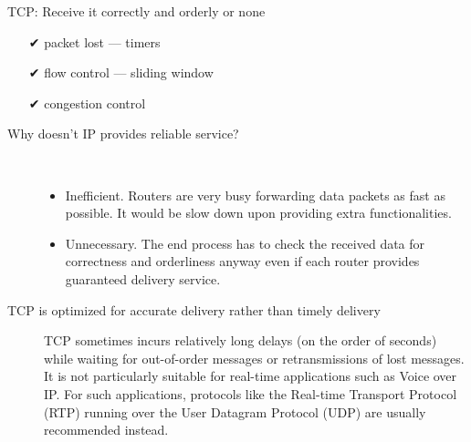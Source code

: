 \begin{frame}
\begin{minipage}[t]{.5\linewidth}
\begin{iblock}{TCP: Receive it correctly and orderly or none}
\begin{itemize}
      \item[✔] packet lost --- timers
      \item[✔] flow control --- sliding window
      \item[✔] congestion control
      \end{itemize}
    \end{iblock}
  \end{minipage}
\end{frame}

\begin{description}
\item[Why doesn't IP provides reliable service?]\,
  \begin{itemize}
  \item Inefficient. Routers are very busy forwarding data packets as fast as possible. It
    would be slow down upon providing extra functionalities.
  \item Unnecessary. The end process has to check the received data for correctness and
    orderliness anyway even if each router provides guaranteed delivery service.
  \end{itemize}
\item[TCP is optimized for accurate delivery rather than timely delivery] TCP sometimes
  incurs relatively long delays (on the order of seconds) while waiting for out-of-order
  messages or retransmissions of lost messages. It is not particularly suitable for
  real-time applications such as Voice over IP. For such applications, protocols like the
  Real-time Transport Protocol (RTP) running over the User Datagram Protocol (UDP) are
  usually recommended instead.
\end{description}

